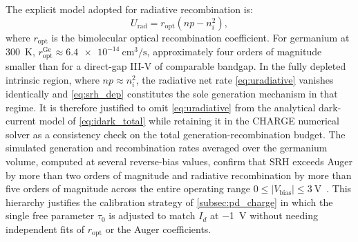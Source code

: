 The explicit model adopted for radiative recombination is:
\begin{equation}
    U_{\mathrm{rad}} = r_{\mathrm{opt}}\!\left(np - n_i^2\right),
    \label{eq:uradiative}
\end{equation}
where $r_{\mathrm{opt}}$ is the bimolecular optical recombination coefficient.
For germanium at \SI{300}{\kelvin}, $r_{\mathrm{opt}}^{\mathrm{Ge}} \approx
\SI{6.4e-14}{\centi\metre\cubed\per\second}$, approximately four orders of
magnitude smaller than for a direct-gap III-V of comparable bandgap. In the
fully depleted intrinsic region, where $np \approx n_i^2$, the radiative net
rate \cref{eq:uradiative} vanishes identically and \cref{eq:srh_dep}
constitutes the sole generation mechanism in that regime. It is therefore
justified to omit \cref{eq:uradiative} from the analytical dark-current model
of \cref{eq:idark_total} while retaining it in the CHARGE numerical solver as
a consistency check on the total generation-recombination budget. The
simulated generation and recombination rates averaged over the germanium
volume, computed at several reverse-bias values, confirm that SRH exceeds
Auger by more than two orders of magnitude and radiative recombination by more
than five orders of magnitude across the entire operating range $0 \leq
|V_{\mathrm{bias}}| \leq \SI{3}{\volt}$~\cite{Alasio2024}. This hierarchy
justifies the calibration strategy of \cref{subsec:pd_charge} in which the
single free parameter $\tau_0$ is adjusted to match $I_d$ at \SI{-1}{\volt}
without needing independent fits of $r_{\mathrm{opt}}$ or the Auger
coefficients.



